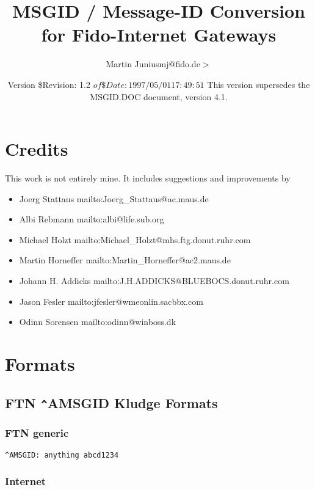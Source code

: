 \documentclass{article}
\title{MSGID / Message-ID Conversion for Fido-Internet Gateways }
\author{Martin Junius{\ttfamily  {\(<\)}mj@fido.de{\(>\)}} }
\date{Version \$Revision: 1.2 $ of \$Date: 1997/05/01 17:49:51 $ This version supersedes the MSGID.DOC document, version 4.1.}
\begin{document}
\maketitle

\section{Credits }



This work is not entirely mine. It includes suggestions and improvements by 
\begin{itemize}
\item Joerg Stattaus 
mailto:Joerg\_Stattaus@ac.maus.de 
\item Albi Rebmann 
mailto:albi@life.sub.org 
\item Michael Holzt 
mailto:Michael\_Holzt@mhs.ftg.donut.ruhr.com 
\item Martin Horneffer 
mailto:Martin\_Horneffer@ac2.maus.de 
\item Johann H. Addicks 
mailto:J.H.ADDICKS@BLUEBOCS.donut.ruhr.com 
\item Jason Fesler 
mailto:jfesler@wmeonlin.sacbbx.com 
\item Odinn Sorensen 
mailto:odinn@winboss.dk  
\end{itemize}



\section{Formats }




\subsection{FTN \verb+^+AMSGID Kludge Formats }




\subsubsection{FTN generic }

\begin{verbatim}
^AMSGID: anything abcd1234 
\end{verbatim}



\subsubsection{Internet }
\end{document}
